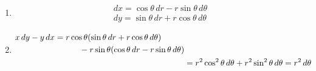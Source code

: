 \begin{ans*}
  ${}$
  \begin{enumerate}[label=(\arabic*)]
    \item
    \begin{gather}
      dx = \cos\theta\,dr - r\sin\theta\,d\theta \\
      dy = \sin\theta\,dr + r\cos\theta\,d\theta
    \end{gather}
    \item
    \begin{align}
      \begin{split}
        x\,dy - y\,dx
        &= r\cos\theta(\sin\theta \,dr + r\cos\theta\,d\theta) \\
        &\hspace*{30pt} - r\sin\theta(\cos\theta\,dr - r\sin\theta\,d\theta)
      \end{split}\\
      &= r^2\cos^2\theta\,d\theta + r^2\sin^2\theta\,d\theta = r^2\,d\theta
    \end{align}
  \end{enumerate}
\end{ans*}


